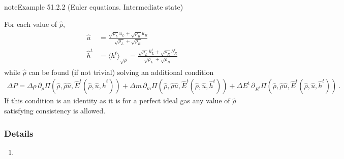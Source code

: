 \documentclass[letterpaper,10pt,english]{jupyterBook}
\begin{document}
\begin{sphinxadmonition}{note}{Example 51.2.2 (Euler equations. Intermediate state)}



\sphinxAtStartPar
{} For each value of \(\hat{\rho}\),
\begin{equation*}
\begin{split}\begin{aligned}
  \hat{u}   & = \frac{\sqrt{\rho_L} u_L + \sqrt{\rho_R} u_R}{\sqrt{\rho_L} + \sqrt{\rho_R}} \\
  \hat{h}^t & = \langle h^t \rangle_{\sqrt{\rho}} = \frac{ \sqrt{\rho_L} h^t_L + \sqrt{\rho_R} h^t_R }{\sqrt{\rho_L} + \sqrt{\rho_R}}
\end{aligned}\end{split}
\end{equation*}
\sphinxAtStartPar
while \(\hat{\rho}\) can be found (if not trivial) solving an additional condition
\begin{equation*}
\begin{split}\Delta P =
    \Delta \rho \, \partial_\rho \Pi(\hat{\rho},\hat{\rho}\hat{u},\hat{E}^t(\hat{\rho}, \hat{u}, \hat{h}^t)) 
  + \Delta m    \, \partial_m    \Pi(\hat{\rho},\hat{\rho}\hat{u},\hat{E}^t(\hat{\rho}, \hat{u}, \hat{h}^t)) 
  + \Delta E^t  \, \partial_{E^t}\Pi(\hat{\rho},\hat{\rho}\hat{u},\hat{E}^t(\hat{\rho}, \hat{u}, \hat{h}^t)) \ .\end{split}
\end{equation*}
\sphinxAtStartPar
If this condition is an identity \sphinxhyphen{} as it is for a perfect ideal gas \sphinxhyphen{} any value of \(\hat{\rho}\) satisfying consistency is allowed.
\subsubsection*{Details}
\begin{enumerate}
%
\setcounter{enumi}{2}
\item {} 
\sphinxAtStartPar
{}


\end{enumerate}
\end{sphinxadmonition}
\end{document}
